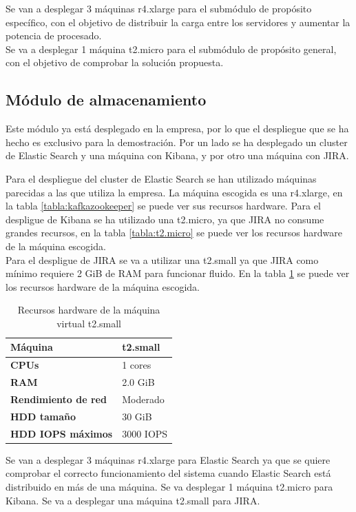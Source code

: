 Se van a desplegar 3 máquinas r4.xlarge para el submódulo de propósito específico, con el objetivo de distribuir la carga entre los servidores y aumentar la potencia de procesado.
\\
Se va a desplegar 1 máquina t2.micro para el submódulo de propósito general, con el objetivo de comprobar la solución propuesta.

\subsection{Módulo de almacenamiento}
Este módulo ya está desplegado en la empresa, por lo que el despliegue que se ha hecho es exclusivo para la demostración. Por un lado se ha desplegado un cluster de Elastic Search y una máquina con Kibana, y por otro una máquina con JIRA.

Para el despliegue del cluster de Elastic Search se han utilizado máquinas parecidas a las que utiliza la empresa. La máquina escogida es una r4.xlarge, en la tabla \ref{tabla:kafkazookeeper} se puede ver sus recursos hardware. Para el despligue de Kibana se ha utilizado una t2.micro, ya que JIRA no consume grandes recursos, en la tabla \ref{tabla:t2.micro} se puede ver los recursos hardware de la máquina escogida.
\\
Para el despligue de JIRA se va a utilizar una t2.small ya que JIRA como mínimo requiere 2 GiB de RAM para funcionar fluido. En la tabla \ref{tabla:t2.small} se puede ver los recursos hardware de la máquina escogida.

\begin{table}[H]\label{tabla:t2.small}
	\centering
	\begin{tabular}{|l|l|}
		\hline
		\textbf{Máquina}            & \textbf{t2.small}      \\ \hline
		\textbf{CPUs}               & 1 cores                \\ \hline
		\textbf{RAM}                & 2.0 GiB                \\ \hline
		\textbf{Rendimiento de red} & Moderado               \\ \hline
		\textbf{HDD tamaño}         & 30 GiB                 \\ \hline
		\textbf{HDD IOPS máximos}   & 3000 IOPS              \\ \hline
	\end{tabular}
	\caption{Recursos hardware de la máquina virtual t2.small}
\end{table}

Se van a desplegar 3 máquinas r4.xlarge para Elastic Search ya que se quiere comprobar el correcto funcionamiento del sistema cuando Elastic Search está distribuido en más de una máquina. Se va desplegar 1 máquina t2.micro para Kibana. Se va a desplegar una máquina t2.small para JIRA.

